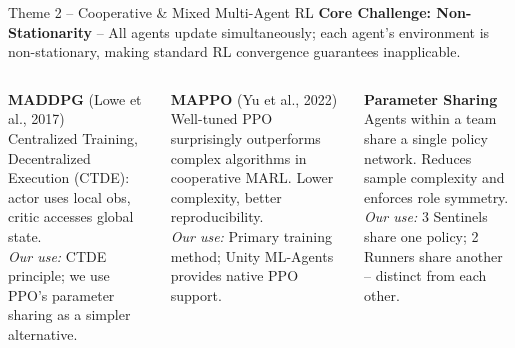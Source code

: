 \documentclass[aspectratio=169,11pt]{beamer}
\begin{document}
\begin{frame}{Theme 2 -- Cooperative \& Mixed Multi-Agent RL}
\textbf{Core Challenge: Non-Stationarity} -- All agents update simultaneously; each agent's environment is non-stationary, making standard RL convergence guarantees inapplicable.

\vspace{6pt}
\begin{columns}[T]
\textbf{MADDPG} {\small(Lowe et al., 2017)}\\[3pt]
Centralized Training, Decentralized Execution (CTDE): actor uses local obs, critic accesses global state.\\[4pt]
{\small\textit{Our use:} CTDE principle; we use PPO's parameter sharing as a simpler alternative.}

\textbf{MAPPO} {\small(Yu et al., 2022)}\\[3pt]
Well-tuned PPO surprisingly outperforms complex algorithms in cooperative MARL. Lower complexity, better reproducibility.\\[4pt]
{\small\textit{Our use:} Primary training method; Unity ML-Agents provides native PPO support.}

\textbf{Parameter Sharing}\\[3pt]
Agents within a team share a single policy network. Reduces sample complexity and enforces role symmetry.\\[4pt]
{\small\textit{Our use:} 3 Sentinels share one policy; 2 Runners share another -- distinct from each other.}
\end{columns}
\end{frame}
\end{document}
